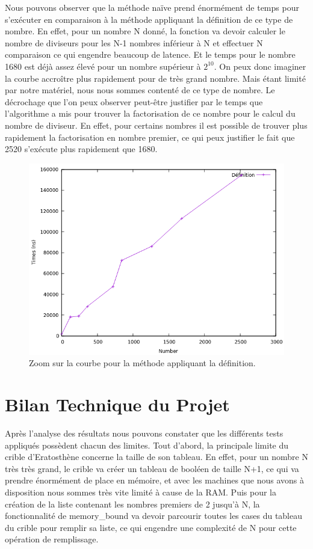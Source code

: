 Nous pouvons observer que la méthode naïve prend énormément de temps pour s'exécuter en comparaison à la méthode appliquant la définition de ce type de nombre. En effet, pour un nombre N donné, la fonction va devoir calculer le nombre de diviseurs pour les N-1 nombres inférieur à N et effectuer N comparaison ce qui engendre beaucoup de latence. Et le temps pour le nombre 1680 est déjà assez élevé  pour un nombre supérieur à $2^{10}$. On peux donc imaginer la courbe accroître plus rapidement pour de très grand nombre. Mais étant limité par notre matériel, nous nous sommes contenté de ce type de nombre. Le décrochage que l'on peux observer peut-être justifier par le temps que l'algorithme a mis pour trouver la factorisation de ce nombre pour le calcul du nombre de diviseur. En effet, pour certains nombres il est possible de trouver plus rapidement la factorisation en nombre premier, ce qui peux justifier le fait que 2520 s'exécute plus rapidement que 1680.
	\begin{figure}[!ht]	
		\begin{center}\includegraphics[scale=0.5]{HCdef.png}\end{center}
		\caption{Zoom sur la courbe pour la méthode appliquant la définition.}
		\label{fg:HCdef}
	\end{figure}
	\section{Bilan Technique du Projet}	
		Après l'analyse des résultats nous pouvons constater que les différents tests appliqués possèdent chacun des limites.	
		Tout d'abord, la principale limite du crible d'Eratosthène concerne la taille de son tableau. En effet, pour un nombre N très très grand, le crible va créer un tableau de booléen de taille N+1, ce qui va prendre énormément de place en mémoire, et avec les machines que nous avons à disposition nous sommes très vite limité à cause de la RAM. Puis pour la création de la liste contenant les nombres premiers de 2 jusqu'à N, la fonctionnalité de memory\_bound va devoir parcourir toutes les cases du tableau du crible pour remplir sa liste, ce qui engendre une complexité de N pour cette opération de remplissage.\\
		
